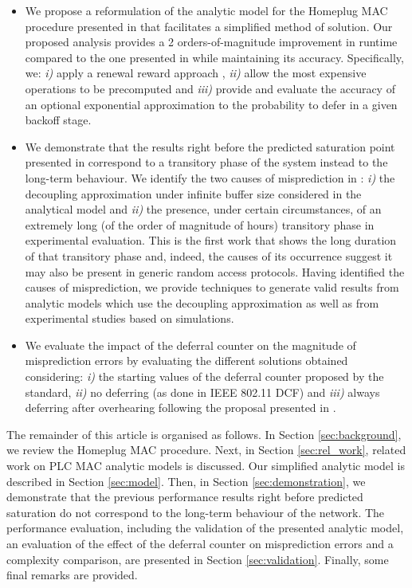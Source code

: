 \documentclass[preprint,12pt]{elsarticle}
\begin{document}
\begin{itemize}
 \item We propose a reformulation of the analytic model for the Homeplug MAC procedure presented in \cite{chung2006performance} that facilitates a simplified method of solution. Our proposed analysis provides a 2 orders-of-magnitude improvement in runtime compared to the one presented in \cite{chung2006performance} while maintaining its accuracy. Specifically, we: \emph{i)} apply a renewal reward approach \cite{kumar05,bianchi05}, \emph{ii)} allow the most expensive operations to be precomputed and \emph{iii)} provide and evaluate the accuracy of an optional exponential approximation to the probability to defer in a given backoff stage.
 \item We demonstrate that the results right before the predicted saturation point presented in \cite{chung2006performance} correspond to a transitory phase of the system instead to the long-term behaviour. We identify the two causes of misprediction in \cite{chung2006performance}: \emph{i)} the decoupling approximation under infinite buffer size considered in the analytical model and \emph{ii)} the presence, under certain circumstances, of an extremely long (of the order of magnitude of hours) transitory phase in experimental evaluation. This is the first work that shows the long duration of that transitory phase and, indeed, the causes of its occurrence suggest it may also be present in generic random access protocols. Having identified the causes of misprediction, we provide techniques to generate valid results from analytic models which use the decoupling approximation as well as from experimental studies based on simulations.
 \item We evaluate the impact of the deferral counter on the magnitude of misprediction errors by evaluating the different solutions obtained considering: \emph{i)} the starting values of the deferral counter proposed by the standard, \emph{ii)} no deferring (as done in IEEE 802.11 DCF) and \emph{iii)} always deferring after overhearing following the proposal presented in \cite{campista2005improving}.
\end{itemize}



The remainder of this article is organised as follows. In Section \ref{sec:background}, we review the Homeplug MAC procedure. Next, in Section \ref{sec:rel_work}, related work on PLC MAC analytic models is discussed. Our simplified analytic model is described in Section \ref{sec:model}. Then, in Section \ref{sec:demonstration}, we demonstrate that the previous performance results right before predicted saturation do not correspond to the long-term behaviour of the network. The performance evaluation, including the validation of the presented analytic model, an evaluation of the effect of the deferral counter on misprediction errors and a complexity comparison, are presented in Section \ref{sec:validation}. Finally, some final remarks are provided.
\end{document}
